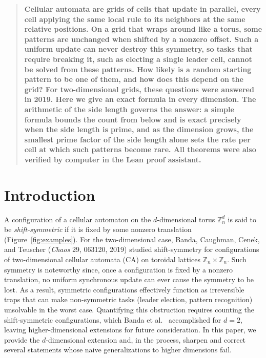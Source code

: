 \documentclass[11pt,a4paper]{article}
\theoremstyle{remark}
\newcommand{\ZZ}{\mathbb{Z}}
\begin{document}
\begin{quote}
\bfseries
Cellular automata are grids of cells that update in parallel, every cell
applying the same local rule to its neighbors at the same relative
positions. On a grid that wraps around like a torus, some patterns are
unchanged when shifted by a nonzero offset. Such a uniform update can never
destroy this symmetry, so tasks that require breaking it, such as electing
a single leader cell, cannot be solved from these patterns. How likely is a
random starting pattern to be one of them, and how does this depend on the
grid? For two-dimensional grids, these questions were answered in 2019.
Here we give an exact formula in every dimension. The arithmetic of the
side length governs the answer: a simple formula bounds the count from
below and is exact precisely when the side length is prime, and as the
dimension grows, the smallest prime factor of the side length alone sets
the rate per cell at which such patterns become rare. All theorems were
also verified by computer in the Lean proof assistant.
\end{quote}

\newpage
\tableofcontents
\newpage

\section{Introduction}

A configuration of a cellular automaton on the $d$-dimensional torus
$\ZZ_n^d$ is said to be \emph{shift-symmetric} if it is fixed by some nonzero
translation (Figure~\ref{fig:examples}).
For the two-dimensional case, Banda, Caughman, Cenek, and Teuscher
(\emph{Chaos} 29, 063120, 2019) studied shift-symmetry for configurations of
two-dimensional cellular automata (CA) on toroidal lattices
$\ZZ_n\times\ZZ_n$. Such symmetry is noteworthy since,  once a configuration is fixed by a nonzero translation, no uniform synchronous update can ever cause the symmetry to be lost. As a result, symmetric
configurations effectively function as irreversible traps that can make non-symmetric tasks
(leader election, pattern recognition) unsolvable in the worst case.
Quantifying this obstruction requires counting the shift-symmetric
configurations, which Banda et al.~\cite{banda2019} accomplished for $d=2$, leaving higher-dimensional extensions for
future consideration. In this paper, we provide the $d$-dimensional extension
and, in the process, sharpen and correct several statements whose naive
generalizations to higher dimensions fail.
\end{document}
